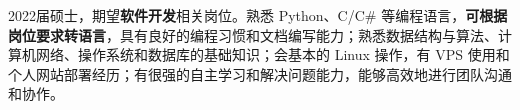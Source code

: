 {\onehalfspacing\hspace{2em}%
2022届硕士，期望\textbf{软件开发}相关岗位。熟悉 Python、C/C\# 等编程语言，\textbf{可根据岗位要求转语言}，具有良好的编程习惯和文档编写能力；熟悉数据结构与算法、计算机网络、操作系统和数据库的基础知识；会基本的 Linux 操作，有 VPS 使用和个人网站部署经历；有很强的自主学习和解决问题能力，能够高效地进行团队沟通和协作。
\par}